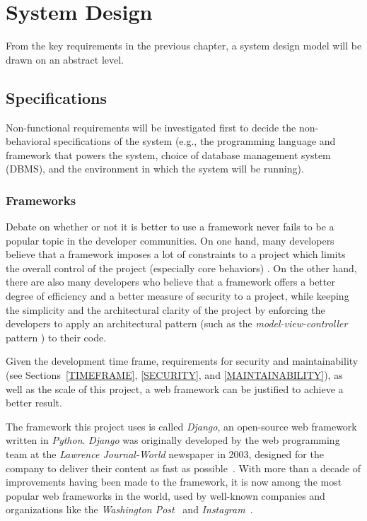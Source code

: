 

\chapter{System Design}
\label{chap:SYSDES}

From the key requirements in the previous chapter,
a system design model will be drawn on an abstract level.

\section{Specifications}
Non-functional requirements will be investigated first to decide the
non-behavioral specifications of the system (e.g., the
programming language and framework that powers the system, choice of database
management system (DBMS),
and the environment in which the system will be running).

\subsection{Frameworks}
Debate on whether or not it is better to use a framework never fails to be
a popular topic in the developer communities. On one hand, many developers
believe that a framework imposes a lot of constraints to a project which limits the
overall control of the project (especially core behaviors) \cite{frameworks}.
On the other hand, there are also many developers who believe that a framework
offers a better degree of efficiency and a better
measure of security to a project, while keeping the simplicity and
the architectural clarity of the project by enforcing the developers to apply
an architectural pattern (such as the \emph{model-view-controller} pattern
\cite{mvc}) to their code.

\medskip

Given the development time frame, requirements for
security and maintainability (see Sections~\ref{TIMEFRAME},
\ref{SECURITY}, and \ref{MAINTAINABILITY}),
as well as the scale of this project,
a web framework can be justified to achieve a better result.

\medskip

The framework this project uses is called \emph{Django}, an open-source web
framework written in \emph{Python}. \emph{Django} was originally developed by
the web programming team at the \emph{Lawrence Journal-World} newspaper in 2003,
designed for the company to deliver their content as fast as
possible~\cite[Chapter 1]{django}.
With more than a decade of improvements
having been made to the framework, it is now among the most popular web
frameworks in the world, used by well-known companies and organizations like the
\emph{Washington Post}~\cite{djangoWashingtonPost}
and \emph{Instagram}~\cite{djangoInstagram}.
\medskip

